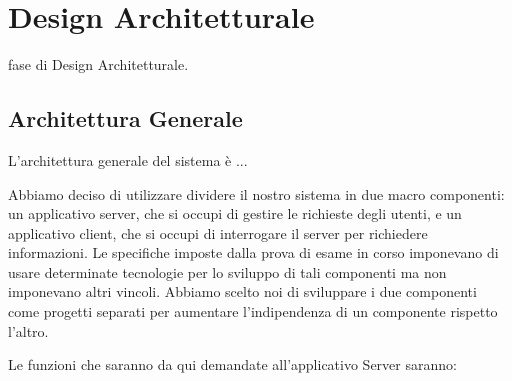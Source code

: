 

\chapter{Design Architetturale}
     fase di Design Architetturale.
    \section{Architettura Generale}
    L'architettura generale del sistema è ...
    
    Abbiamo deciso di utilizzare dividere il nostro sistema in due macro componenti: un applicativo server, che si occupi di gestire le richieste degli utenti, e un applicativo client, che si occupi di interrogare il server per richiedere informazioni. Le specifiche imposte dalla prova di esame in corso imponevano di usare determinate tecnologie per lo sviluppo di tali componenti ma non imponevano altri vincoli. Abbiamo scelto noi di sviluppare i due componenti come progetti separati per aumentare l'indipendenza di un componente rispetto l'altro.
    
    \par Le funzioni che saranno da qui demandate all'applicativo Server saranno:
    
